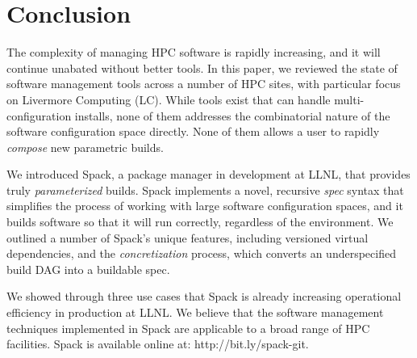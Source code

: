 
\section{Conclusion}
\label{sec:conclusion}


The complexity of managing HPC software is rapidly increasing, and it
will continue unabated without better tools.
In this paper, we reviewed the state of software management tools 
across a number of HPC sites, with particular focus on Livermore
Computing (LC). While tools exist that can handle multi-configuration
installs, none of them addresses the combinatorial nature
of the software configuration space directly. None of them allows
a user to rapidly {\it compose} new parametric builds.

We introduced Spack, a package manager in development at LLNL, that
provides truly {\it parameterized} builds.  Spack implements
a novel, recursive {\it spec} syntax that simplifies the process of working
with large software configuration spaces, and it builds software 
so that it will run correctly, regardless of the environment.
We outlined a number of Spack's unique features, including
versioned virtual dependencies, and the {\it concretization} process,
which converts an underspecified build DAG into a buildable spec.

We showed through three use cases that Spack is already
increasing operational efficiency 
in production at LLNL.  We believe that the software management
techniques implemented in
Spack are applicable to a broad range of HPC facilities.
Spack is available online at: http://bit.ly/spack-git.



